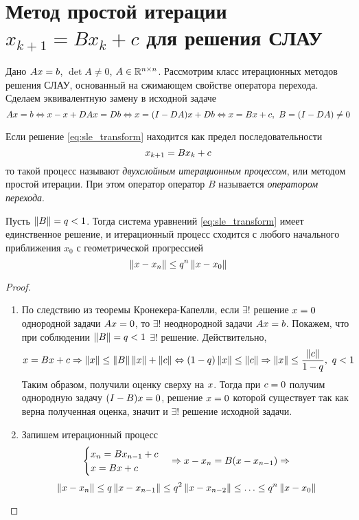 \section[Метод простой итерации]{Метод простой итерации $x_{k+1}=Bx_k+c$ для решения СЛАУ}

Дано $A\*x=\*b$, $\det{A}\neq0$, $A\in\mathbb{R}^{n\times n}$. Рассмотрим класс итерационных
методов решения СЛАУ, основанный на сжимающем свойстве оператора перехода.
Сделаем эквивалентную замену в исходной задаче
\begin{equation}\label{eq:sle_transform}
  A\*x=\*b \Leftrightarrow \*x-\*x+DA\*x=D\*b\Leftrightarrow \*x=(I-DA)\*x+D\*b\Leftrightarrow \*x=B\*x+\*c,\ B=(I-DA)\neq0
\end{equation}
\begin{definition}
  Если решение \eqref{eq:sle_transform} находится как предел последовательности
  \begin{equation}\label{eq:sle_iter}
    \*x_{k+1}=B\*x_{k}+\*c
  \end{equation}
  то такой процесс называют \textit{двухслойным итерационным процессом}, или
  методом простой итерации. При этом оператор оператор $B$ называется
  \textit{оператором перехода}.
\end{definition}

\begin{theorem}
  Пусть $\left\lVert B\right\rVert=q<1$. Тогда система уравнений \eqref{eq:sle_transform}
  имеет единственное решение, и итерационный процесс сходится с любого
  начального приближения $x_0$ с геометрической прогрессией
  \[\norm{\*x-\*x_n}\leq q^n\norm{\*x-\*x_0}\]
\end{theorem}
\begin{proof}
  \begin{enumerate}
    \item По следствию из теоремы Кронекера-Капелли, если $\exists!$ решение $\*x=0$ однородной задачи $A\*x=0$,
          то $\exists!$ неоднородной задачи $A\*x=\*b$. Покажем, что при соблюдении
          $\left\lVert B\right\rVert=q<1$ $\exists!$ решение. Действительно,
          \[\*x=B\*x+\*c\Rightarrow\norm{\*x}\leq\norm{B}\norm{\*x}+\norm{\*c}\Leftrightarrow (1-q)\norm{\*x}\leq\norm{\*c}\Rightarrow \norm{\*x}\leq\frac{\norm{\*c}}{1-q},\ q<1\]
          Таким образом, получили оценку сверху на $\*x$. Тогда при $\*c=0$
          получим однородную задачу $(I-B)\*x=0$, решение $\*x=0$ которой
          существует так как верна полученная оценка, значит и $\exists!$
          решение исходной задачи.
    \item Запишем итерационный процесс
          \[\begin{cases}
              \*x_{n}=B\*x_{n-1}+\*c \\
              \*x=B\*x+\*c
            \end{cases}\Rightarrow
            \*x-\*x_{n}=B(\*x-\*x_{n-1})\Rightarrow
          \]
          \[\norm{\*x-\*x_{n}}\leq q\norm{\*x-\*x_{n-1}}\leq q^2\norm{\*x-\*x_{n-2}}\leq\ldots\leq q^n\norm{\*x-\*x_0}\]
  \end{enumerate}
\end{proof}

